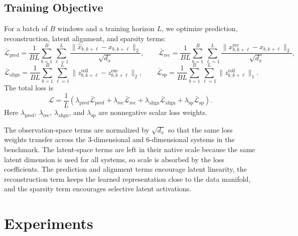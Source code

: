\documentclass{article}
\begin{document}
\subsection{Training Objective}
\label{sec:training-objective}

For a batch of $B$ windows and a training horizon $L$, we optimize prediction, reconstruction, latent alignment, and sparsity terms:
\begin{equation}
\label{eq:loss-terms-state}
\bar{\mathcal{L}}_{\mathrm{pred}} =
\frac{1}{BL}\sum_{b=1}^{B}\sum_{\ell=1}^{L}
\frac{\|\hat{x}_{b,k+\ell} - x_{b,k+\ell}\|_2}{\sqrt{d_x}},
\qquad
\bar{\mathcal{L}}_{\mathrm{rec}} =
\frac{1}{BL}\sum_{b=1}^{B}\sum_{\ell=1}^{L}
\frac{\|x_{b,k+\ell}^{\mathrm{rec}} - x_{b,k+\ell}\|_2}{\sqrt{d_x}},
\end{equation}
\begin{equation}
\label{eq:loss-terms-latent}
\bar{\mathcal{L}}_{\mathrm{align}} =
\frac{1}{BL}\sum_{b=1}^{B}\sum_{\ell=1}^{L}
\|z_{b,k+\ell}^{\mathrm{roll}} - z_{b,k+\ell}^{\mathrm{enc}}\|_2,
\qquad
\bar{\mathcal{L}}_{\mathrm{sp}} =
\frac{1}{BL}\sum_{b=1}^{B}\sum_{\ell=1}^{L}
\|z_{b,k+\ell}^{\mathrm{roll}}\|_1.
\end{equation}
The total loss is
\begin{equation}
    \mathcal{L}
    =
    \frac{1}{L}
    \left(
    \lambda_{\mathrm{pred}} \bar{\mathcal{L}}_{\mathrm{pred}}
    +
    \lambda_{\mathrm{rec}} \bar{\mathcal{L}}_{\mathrm{rec}}
    +
    \lambda_{\mathrm{align}} \bar{\mathcal{L}}_{\mathrm{align}}
    +
    \lambda_{\mathrm{sp}} \bar{\mathcal{L}}_{\mathrm{sp}}
    \right).
\end{equation}
Here $\lambda_{\mathrm{pred}}$, $\lambda_{\mathrm{rec}}$, $\lambda_{\mathrm{align}}$, and $\lambda_{\mathrm{sp}}$ are nonnegative scalar loss weights.

The observation-space terms are normalized by $\sqrt{d_x}$ so that the same loss weights transfer across the 3-dimensional and 6-dimensional systems in the benchmark. The latent-space terms are left in their native scale because the same latent dimension is used for all systems, so scale is absorbed by the loss coefficients. The prediction and alignment terms encourage latent linearity, the reconstruction term keeps the learned representation close to the data manifold, and the sparsity term encourages selective latent activations.

\section{Experiments}
\label{sec:experiments}
\end{document}
